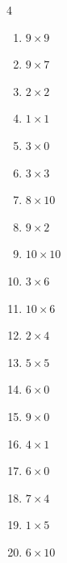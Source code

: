 \begin{multicols}{4}
\begin{enumerate}
\columnbreak %

\resetques

  \item $9\times 9$
        \phantom{$=81$}

  \item $9\times 7$
        \phantom{$=63$}

  \item $2\times 2$
        \phantom{$=4$}

  \item $1\times 1$
        \phantom{$=1$}

  \item $3\times 0$
        \phantom{$=0$}

  \item $3\times 3$
        \phantom{$=9$}

  \item $8\times 10$
        \phantom{$=80$}

  \item $9\times 2$
        \phantom{$=18$}

  \item $10\times 10$
        \phantom{$=100$}

  \item $3\times 6$
        \phantom{$=18$}

  \item $10\times 6$
        \phantom{$=60$}

  \item $2\times 4$
        \phantom{$=8$}

  \item $5\times 5$
        \phantom{$=25$}

  \item $6\times 0$
        \phantom{$=0$}

  \item $9\times 0$
        \phantom{$=0$}

  \item $4\times 1$
        \phantom{$=4$}

  \item $6\times 0$
        \phantom{$=0$}

  \item $7\times 4$
        \phantom{$=28$}

  \item $1\times 5$
        \phantom{$=5$}

  \item $6\times 10$
        \phantom{$=60$}


\end{enumerate}
\end{multicols}
